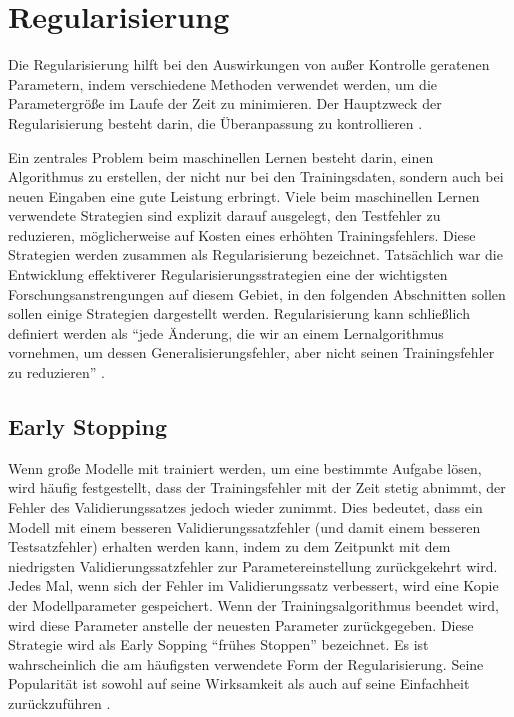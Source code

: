     \section{Regularisierung}
    Die Regularisierung hilft bei den Auswirkungen von außer Kontrolle geratenen Parametern, indem verschiedene Methoden verwendet werden, um die Parametergröße im Laufe der Zeit zu minimieren. Der Hauptzweck der Regularisierung besteht darin, die Überanpassung zu kontrollieren \cite*[79]{Patterson2019}.

    Ein zentrales Problem beim maschinellen Lernen besteht darin, einen Algorithmus zu erstellen, der nicht nur bei den Trainingsdaten, sondern auch bei neuen Eingaben eine gute Leistung erbringt. Viele beim maschinellen Lernen verwendete Strategien sind explizit darauf ausgelegt, den Testfehler zu reduzieren, möglicherweise auf Kosten eines erhöhten Trainingsfehlers. Diese Strategien werden zusammen als Regularisierung bezeichnet. Tatsächlich war die Entwicklung effektiverer Regularisierungsstrategien eine der wichtigsten Forschungsanstrengungen auf diesem Gebiet, in den folgenden Abschnitten sollen sollen einige Strategien dargestellt werden. Regularisierung kann schließlich definiert werden als \enquote{jede Änderung, die wir an einem Lernalgorithmus vornehmen, um dessen Generalisierungsfehler, aber nicht seinen Trainingsfehler zu reduzieren} \cite*[228]{IanGoodfellowYoshuaBengio2016}.

    \subsection{Early Stopping}
    Wenn große Modelle mit trainiert werden, um eine bestimmte Aufgabe lösen, wird häufig festgestellt, dass der Trainingsfehler mit der Zeit stetig abnimmt, der Fehler des Validierungssatzes jedoch wieder zunimmt. Dies bedeutet, dass ein Modell mit einem besseren Validierungssatzfehler (und damit  einem besseren Testsatzfehler) erhalten werden kann, indem zu dem Zeitpunkt mit dem niedrigsten Validierungssatzfehler zur Parametereinstellung zurückgekehrt wird. Jedes Mal, wenn sich der Fehler im Validierungssatz verbessert, wird eine Kopie der Modellparameter gespeichert. Wenn der Trainingsalgorithmus beendet wird, wird diese Parameter anstelle der neuesten Parameter zurückgegeben. Diese Strategie wird als Early Sopping \enquote{frühes Stoppen} bezeichnet. Es ist wahrscheinlich die am häufigsten verwendete Form der Regularisierung. Seine Popularität ist sowohl auf seine Wirksamkeit als auch auf seine Einfachheit zurückzuführen \cite*[246]{IanGoodfellowYoshuaBengio2016}.



